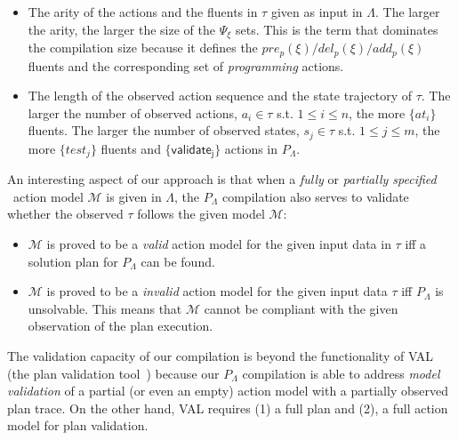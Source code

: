 \begin{itemize}
\item The arity of the actions and the fluents in $\tau$ given as input in $\Lambda$. The larger the arity, the larger the size of the $\Psi_{\xi}$ sets. This is the term that dominates the compilation size because it defines the $pre_p(\xi)/del_p(\xi)/add_p(\xi)$ fluents and the corresponding set of {\em programming} actions.
\item The length of the observed action sequence and the state trajectory of $\tau$. The larger the number of observed actions, $a_i\in\tau$ s.t. $1\leq i\leq n$, the more $\{at_i\}$ fluents. The larger the number of observed states, $s_j\in\tau$ s.t. $1\leq j\leq m$, the more $\{test_j\}$ fluents and $\{\mathsf{validate_{j}}\}$ actions in $P_{\Lambda}$.
\end{itemize}

An interesting aspect of our approach is that when a {\em fully} or {\em partially specified} \strips\ action model $\mathcal{M}$ is given in $\Lambda$, the $P_{\Lambda}$ compilation also serves to validate whether the observed $\tau$ follows the given model $\mathcal{M}$:

\begin{itemize}
	\item $\mathcal{M}$ is proved to be a {\em valid} action model for the given input data in $\tau$ iff a solution plan for $P_{\Lambda}$ can be found.
	\item $\mathcal{M}$ is proved to be a {\em invalid} action model for the given input data $\tau$ iff $P_{\Lambda}$ is unsolvable. This means that $\mathcal{M}$ cannot be compliant with the given observation of the plan execution.
\end{itemize}


The validation capacity of our compilation is beyond the functionality of VAL (the plan validation tool~\cite{howey2004val}) because our $P_{\Lambda}$ compilation is able to address {\em model validation} of a partial (or even an empty) action model with a partially observed plan trace. On the other hand, VAL requires (1) a full plan and (2), a full action model for plan validation.


